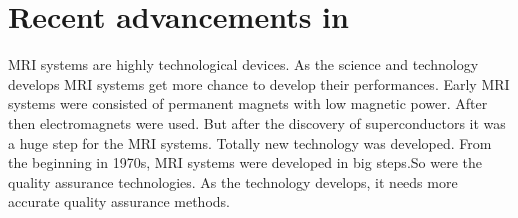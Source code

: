 \documentclass[12pt]{article}
\makeatletter
\let\thetitle\@title
\makeatother
\begin{document}





\pagebreak
\section{Recent advancements in \thetitle}
MRI systems are highly technological devices. As the science and technology develops MRI systems get more chance to develop their performances. Early MRI systems were consisted of permanent magnets with low magnetic power. After then electromagnets were used. But after the discovery of superconductors it was a huge step for the MRI systems. Totally new technology was developed. From the beginning in 1970s, MRI systems were developed in big steps.So were the quality assurance technologies. As the technology develops, it needs more accurate quality assurance methods. 
\end{document}
